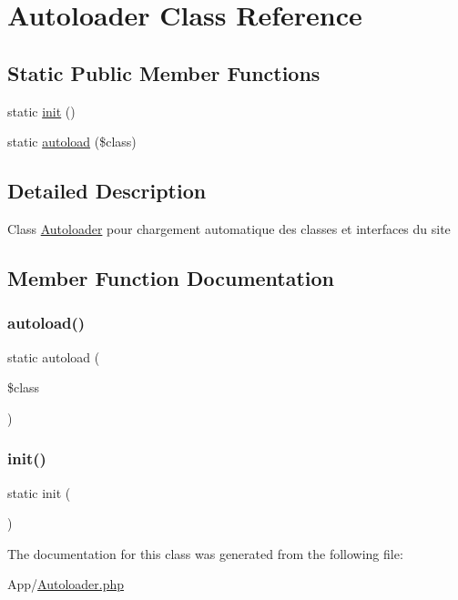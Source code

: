 \hypertarget{class_autoloader}{}\section{Autoloader Class Reference}
\label{class_autoloader}
\subsection*{Static Public Member Functions}
\begin{DoxyCompactItemize}
\item 
static \hyperlink{class_autoloader_a9f0be6ae273d3669e11c29910a0be338}{init} ()
\item 
static \hyperlink{class_autoloader_ab4c022bf9d3474583030f31894865182}{autoload} (\$class)
\end{DoxyCompactItemize}


\subsection{Detailed Description}
Class \hyperlink{class_autoloader}{Autoloader} pour chargement automatique des classes et interfaces du site 

\subsection{Member Function Documentation}
\mbox{\label{class_autoloader_ab4c022bf9d3474583030f31894865182}} 
\subsubsection{\texorpdfstring{autoload()}{autoload()}}
{\footnotesize\ttfamily static autoload (\begin{DoxyParamCaption}\item[{}]{\$class }\end{DoxyParamCaption})\hspace{0.3cm}{\ttfamily [static]}}

\mbox{\label{class_autoloader_a9f0be6ae273d3669e11c29910a0be338}} 
\subsubsection{\texorpdfstring{init()}{init()}}
{\footnotesize\ttfamily static init (\begin{DoxyParamCaption}{ }\end{DoxyParamCaption})\hspace{0.3cm}{\ttfamily [static]}}



The documentation for this class was generated from the following file\+:\begin{DoxyCompactItemize}
\item 
App/\hyperlink{_autoloader_8php}{Autoloader.\+php}\end{DoxyCompactItemize}
